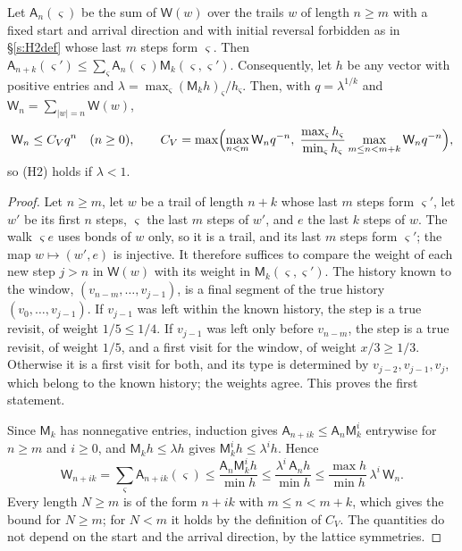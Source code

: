 \begin{lemma}\label{l:alm}
Let $\mathsf A_n(\varsigma)$ be the sum of $\mathsf W(w)$ over the trails $w$ of length $n \ge m$ with a fixed start and arrival direction and with initial reversal forbidden as in \S\ref{s:H2def} whose last $m$ steps form $\varsigma$. Then $\mathsf A_{n + k}(\varsigma') \le \sum_\varsigma \mathsf A_n(\varsigma) \mathsf M_k(\varsigma, \varsigma')$. Consequently, let $h$ be any vector with positive entries and $\lambda = \max_\varsigma (\mathsf M_k h)_\varsigma / h_\varsigma$. Then, with $q = \lambda^{1/k}$ and $\mathsf W_n = \sum_{|w| = n} \mathsf W(w)$,
\begin{equation*}
\mathsf W_n \le C_V q^n \quad (n \ge 0), \qquad C_V = \max\Bigl( \max_{n < m} \mathsf W_n q^{-n}, \; \frac{\max_\varsigma h_\varsigma}{\min_\varsigma h_\varsigma} \max_{m \le n < m + k} \mathsf W_n q^{-n} \Bigr),
\end{equation*}
so (H2) holds if $\lambda < 1$.
\end{lemma}

\begin{proof}
Let $n \ge m$, let $w$ be a trail of length $n + k$ whose last $m$ steps form $\varsigma'$, let $w'$ be its first $n$ steps, $\varsigma$ the last $m$ steps of $w'$, and $e$ the last $k$ steps of $w$. The walk $\varsigma e$ uses bonds of $w$ only, so it is a trail, and its last $m$ steps form $\varsigma'$; the map $w \mapsto (w', e)$ is injective. It therefore suffices to compare the weight of each new step $j > n$ in $\mathsf W(w)$ with its weight in $\mathsf M_k(\varsigma, \varsigma')$. The history known to the window, $(v_{n - m}, \dots, v_{j - 1})$, is a final segment of the true history $(v_0, \dots, v_{j - 1})$. If $v_{j - 1}$ was left within the known history, the step is a true revisit, of weight $1/5 \le 1/4$. If $v_{j - 1}$ was left only before $v_{n - m}$, the step is a true revisit, of weight $1/5$, and a first visit for the window, of weight $x/3 \ge 1/3$. Otherwise it is a first visit for both, and its type is determined by $v_{j - 2}, v_{j - 1}, v_j$, which belong to the known history; the weights agree. This proves the first statement.

Since $\mathsf M_k$ has nonnegative entries, induction gives $\mathsf A_{n + ik} \le \mathsf A_n \mathsf M_k^i$ entrywise for $n \ge m$ and $i \ge 0$, and $\mathsf M_k h \le \lambda h$ gives $\mathsf M_k^i h \le \lambda^i h$. Hence
\begin{equation*}
\mathsf W_{n + ik} = \sum_\varsigma \mathsf A_{n + ik}(\varsigma) \le \frac{\mathsf A_n \mathsf M_k^i h}{\min h} \le \frac{\lambda^i \, \mathsf A_n h}{\min h} \le \frac{\max h}{\min h} \, \lambda^i \, \mathsf W_n .
\end{equation*}
Every length $N \ge m$ is of the form $n + ik$ with $m \le n < m + k$, which gives the bound for $N \ge m$; for $N < m$ it holds by the definition of $C_V$. The quantities do not depend on the start and the arrival direction, by the lattice symmetries.
\end{proof}

